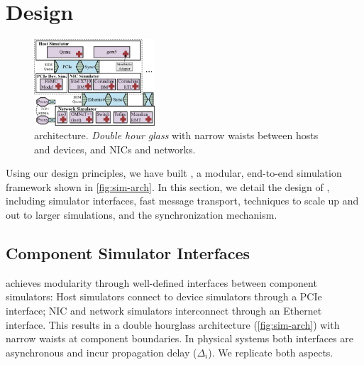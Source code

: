 \section{Design}
\label{sec:design}

\begin{figure}%
\centering%
\includegraphics[width=0.4\textwidth]{figures/simarch.pdf}%
\caption{\sysname architecture.
\emph{Double hour glass} with narrow waists between hosts and
  devices, and NICs and networks.}%
\label{fig:sim-arch}%
%
\end{figure}


Using our design principles, we have built \sysname, a modular,
end-to-end simulation framework shown in \autoref{fig:sim-arch}.
%
In this section, we detail the design of \sysname{}, including
simulator interfaces, fast message transport, techniques to scale
up and out to larger simulations, and the synchronization mechanism.

\subsection{Component Simulator Interfaces}
\label{ssec:design:interface}
%
\sysname{} achieves modularity through well-defined interfaces
between component simulators:
%
Host simulators connect to device simulators through a PCIe interface;
%
NIC and network simulators interconnect through an
Ethernet interface.
%
This results in a double hourglass architecture
(\autoref{fig:sim-arch}) with narrow waists at component boundaries.
%
In physical systems both interfaces are asynchronous and incur
propagation delay ($\Delta_i$).
%
We replicate both aspects.


